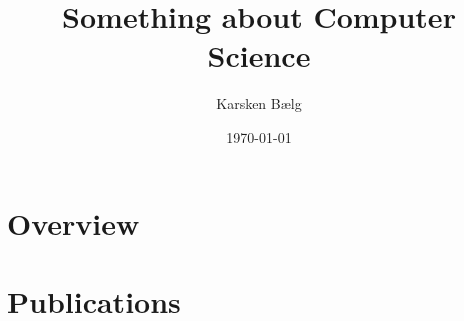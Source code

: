 \documentclass[11pt,a4paper,twoside,openright,oldfontcommands]{memoir}
\title{Something about Computer Science}
\author{Karsken Bælg}
\date{\today}
\begin{document}


\frontmatter


\cleardoublepage
\tableofcontents
\cleardoublepage

\mainmatter
{}


\part{Overview}
\label{part:overview}




\part{Publications}
\label{part:publications}



\backmatter



\cleardoublepage
 

\end{document}
